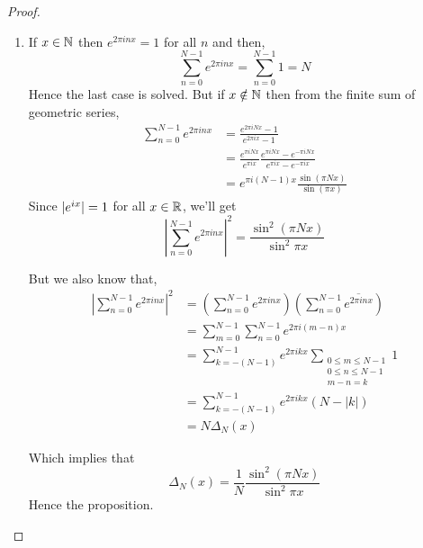   \begin{proof}
    \begin{enumerate}[label=(\alph*)]
      \item
        If $x\in \mathbb N$ then $e^{2\pi inx} = 1$ for all $n$ and then,
        \begin{displaymath}
          \sum_{n=0}^{N-1}e^{2\pi inx} = \sum_{n=0}^{N-1} 1 = N
        \end{displaymath}
        Hence the last case is solved. But if $x\notin \mathbb N$ then from the finite sum of geometric series,
        \begin{align*}
          \sum_{n=0}^{N-1}e^{2\pi inx} &= \frac{e^{2\pi iNx} - 1}{e^{2\pi ix} - 1} \\
                  & = \frac{e^{\pi iNx}}{e^{\pi ix}} \frac{e^{\pi iNx} - e^{-\pi iNx}}{e^{\pi ix} - e^{-\pi ix}} \\
                  & = e^{\pi i(N-1)x}\frac{\sin(\pi Nx)}{\sin(\pi x)}
        \end{align*}
        Since $\lvert e^{ix}\rvert = 1$ for all $x\in \mathbb R$, we'll get
        \begin{displaymath}
          \left|\sum_{n=0}^{N-1}e^{2 \pi inx}\right|^2 = \frac{\sin^2(\pi Nx)}{\sin^2{\pi x}}  
        \end{displaymath}

        But we also know that,
        \begin{align*}
         \left|\sum_{n=0}^{N-1}e^{2 \pi inx}\right|^2 &= \left(\sum_{n=0}^{N-1}e^{2 \pi inx}\right)  \left(\sum_{n=0}^{N-1}\overline{e^{2 \pi inx}}\right) \\
            &= \sum_{m=0}^{N-1} \sum_{n=0}^{N-1} e^{2\pi i(m-n)x} \\
            &= \sum_{k = -(N-1)}^{N-1} e^{2\pi ikx} \sum_{\substack{0\le m \le N-1 \\ 0 \le n \le N-1 \\ m-n = k}}1 \\
            &= \sum_{k = -(N-1)}^{N-1} e^{2\pi ikx} (N - |k|) \\
            &= N\Delta_N(x)
        \end{align*}

        Which implies that 
        \begin{displaymath}
          \Delta_N(x) = \frac{1}{N}\frac{\sin^2(\pi Nx)}{\sin^2{\pi x}}
        \end{displaymath}
      Hence the proposition.
    \end{enumerate}
\end{proof}
  

